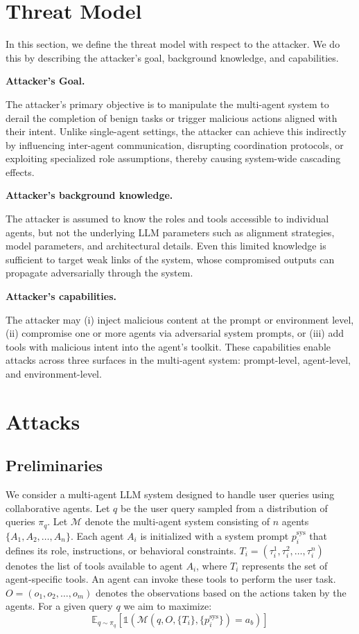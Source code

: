 \section{Threat Model}
In this section, we define the threat model with respect to the attacker. We do this by describing the attacker's goal, background knowledge, and capabilities.

\textbf{Attacker's Goal.}

The attacker's primary objective is to manipulate the multi-agent system to derail the completion of benign tasks or trigger malicious actions aligned with their intent. Unlike single-agent settings, the attacker can achieve this indirectly by influencing inter-agent communication, disrupting coordination protocols, or exploiting specialized role assumptions, thereby causing system-wide cascading effects.


\textbf{Attacker's background knowledge.}
 
The attacker is assumed to know the roles and tools accessible to individual agents, but not the underlying LLM parameters such as alignment strategies, model parameters, and architectural details. Even this limited knowledge is sufficient to target weak links of the system, whose compromised outputs can propagate adversarially through the system.

\textbf{Attacker's capabilities.}

The attacker may (i) inject malicious content at the prompt or environment level, (ii) compromise one or more agents via adversarial system prompts, or (iii) add tools with malicious intent into the agent's toolkit. These capabilities enable attacks across three surfaces in the multi-agent system: prompt-level, agent-level, and environment-level.

\section{Attacks}
\subsection{Preliminaries}
We consider a multi-agent LLM system designed to handle user queries using collaborative agents. Let $q$ be the user query sampled from a distribution of queries $\pi_q$. Let $\mathcal{M}$ denote the multi-agent system consisting of $n$ agents $\{A_1, A_2, \dots, A_n\}$. Each agent $A_i$ is initialized with a system prompt $p^{\text{sys}}_i$ that defines its role, instructions, or behavioral constraints. $T_i = (\tau_i^1, \tau_i^2, \dots, \tau_i^n)$ denotes the list of tools available to agent $A_i$, where $T_i$ represents the set of agent-specific tools. An agent can invoke these tools to perform the user task. $O = (o_1, o_2, \dots, o_m)$ denotes the observations based on the actions taken by the agents. For a given query $q$ we aim to maximize:
\begin{equation}
  \mathbb{E}_{q \sim \pi_q} \left[ \mathds{1}\left( \mathcal{M}(q, O, \{T_i\}, \{p^{\text{sys}}_i\}) = a_b \right) \right]  
\end{equation}



